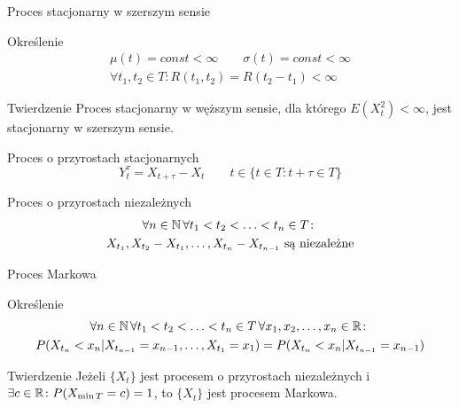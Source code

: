 \documentclass{mp}
\begin{document}
\begin{frame}{Proces stacjonarny w szerszym sensie}
\begin{block}{Określenie}
\begin{gather*}
 \mu(t)=const<\infty \qquad \sigma(t)=const<\infty \\
 \forall t_1,t_2\in T\colon R(t_1,t_2)=R(t_2-t_1)<\infty
\end{gather*}
\end{block}
\begin{block}{Twierdzenie}
Proces stacjonarny w węższym sensie, dla którego $E(X^2_t)<\infty$, jest stacjonarny w szerszym sensie.
\end{block}
\end{frame}
\begin{frame}{Proces o przyrostach stacjonarnych}
\[ Y^\tau_t=X_{t+\tau}-X_t \qquad t\in\{t\in T\colon t+\tau\in T\} \]
\end{frame}
\begin{frame}{Proces o przyrostach niezależnych}
\begin{gather*}
\forall n\in \mathbb{N}\, \forall t_1<t_2<\ldots<t_n\in T\colon\\
X_{t_1},X_{t_2}-X_{t_1},\ldots,X_{t_n}-X_{t_{n-1}} \text{ są niezależne}
\end{gather*}
\end{frame}
\begin{frame}{Proces Markowa}
\begin{block}{Określenie}
\begin{gather*}
\forall n\in \mathbb{N}\, \forall t_1<t_2<\ldots<t_n\in T\, \forall x_1,x_2,\ldots,x_n\in\mathbb{R} \colon\\
P(X_{t_n}<x_n|X_{t_{n-1}}=x_{n-1},\ldots,X_{t_1}=x_1) = P(X_{t_n}<x_n|X_{t_{n-1}}=x_{n-1})
\end{gather*}
\end{block}
\begin{block}{Twierdzenie}
Jeżeli $\{X_t\}$ jest procesem o przyrostach niezależnych i $\exists c\in\mathbb{R}\colon P(X_{\min T}=c)=1$, to $\{X_t\}$ jest procesem Markowa.
\end{block}
\end{frame}
\end{document}
